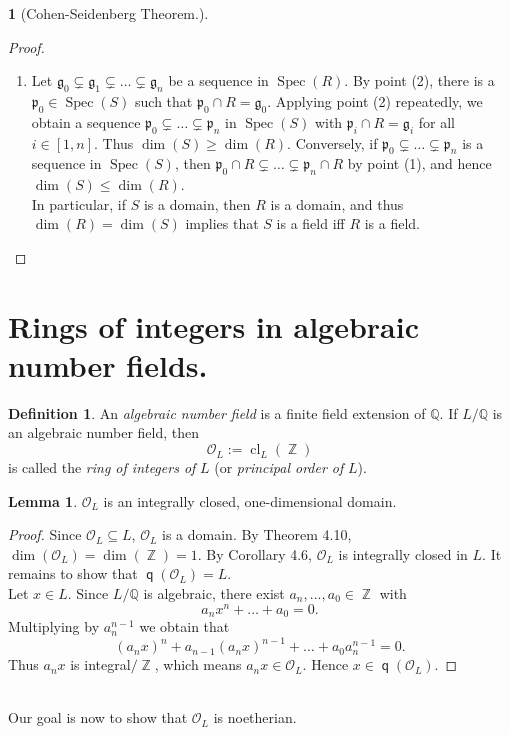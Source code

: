 \documentclass[12pt,a4paper]{report}
\theoremstyle{definition}
\newtheorem{lemma}[theorem]{Lemma}
\newtheorem{defn}[theorem]{Definition}
\theoremstyle{num.custom-title}
\newtheorem{teo_custom-title}[theorem]{} %
\DeclareMathOperator{\Z}{\mathbb{Z}}
\DeclareMathOperator{\sse}{\subseteq}
\DeclareMathOperator{\cl}{cl}
\DeclareMathOperator{\Spec}{Spec}
\DeclareMathOperator{\q}{\mathsf{q}}
\newcommand{\Q}{\mathbb{Q}}
\newcommand{\g}{\mathfrak{g}}
\newcommand{\p}{\mathfrak{p}}
\renewcommand{\O}{\mathcal{O}}
\begin{document}
\begin{teo_custom-title}[Cohen-Seidenberg Theorem.]
\begin{proof}
\begin{enumerate}
If $S$ is a field, then $R^\times = S^\times \cap R = S^\circ \cap R = R^\circ$, and hence $R$ is a field.
\item Let $\g_0 \subsetneq \g_1 \subsetneq \ldots \subsetneq \g_n$ be a sequence in $\Spec(R)$. By point (2), there is a $\p_0 \in \Spec(S)$ such that $\p_0 \cap R = \g_0$. Applying point (2) repeatedly, we obtain a sequence $\p_0 \subsetneq \ldots \subsetneq \p_n$ in $\Spec(S)$ with $\p_i \cap R = \g_i$ for all $i \in [1,n]$. Thus $\dim(S) \geq \dim(R)$. Conversely, if $\p_0 \subsetneq \ldots \subsetneq \p_n$ is a sequence in $\Spec(S)$, then $\p_0 \cap R \subsetneq \ldots \subsetneq \p_n \cap R$ by point (1), and hence $\dim(S) \leq \dim(R)$.\\
In particular, if $S$ is a domain, then $R$ is a domain, and thus $\dim(R)=\dim(S)$ implies that $S$ is a field iff $R$ is a field.
\end{enumerate}
\end{proof}
\end{teo_custom-title}


\section{Rings of integers in algebraic number fields.}

\begin{defn}
An \emph{algebraic number field} is a finite field extension of $\Q$. If $L/\Q$ is an algebraic number field, then
\[
\O_L := \cl_L(\Z)
\]
is called the \emph{ring of integers of} $L$ (or \emph{principal order of} $L$).
\end{defn}

\begin{lemma}
$\O_L$ is an integrally closed, one-dimensional domain.
\begin{proof}
Since $\O_L \sse L$, $\O_L$ is a domain. By Theorem 4.10, $\dim(\O_L)=\dim(\Z)=1$. By Corollary 4.6, $\O_L$ is integrally closed in $L$. It remains to show that $\q(\O_L)=L$. \\
Let $x \in L$. Since $L/\Q$ is algebraic, there exist $a_n,...,a_0 \in \Z$ with
\[
a_n x^n + \ldots + a_0 = 0.
\]
Multiplying by $a_n^{n-1}$ we obtain that
\[
(a_n x)^n + a_{n-1} (a_n x)^{n-1} + \ldots + a_0 a_n^{n-1} = 0.
\]
Thus $a_n x$ is integral$/\Z$, which means $a_n x \in \O_L$. Hence $x \in \q(\O_L)$.
\end{proof}
\end{lemma}
\ \\
Our goal is now to show that $\O_L$ is noetherian.
\end{document}

